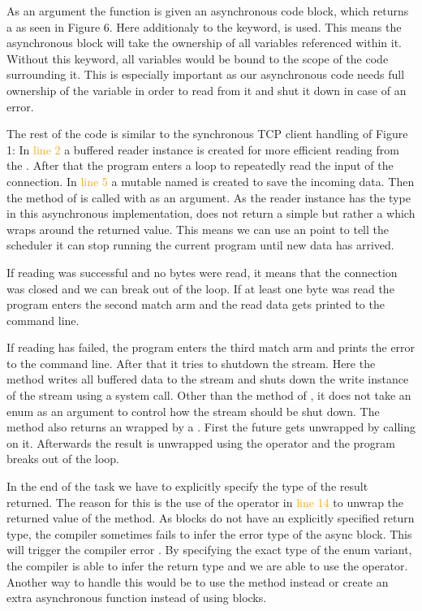 As an argument the function is given an asynchronous code block, which returns a  as seen in Figure 6.
Here additionaly to the  keyword,  is used. This means the asynchronous block will take the
ownership of all variables referenced within it. Without this keyword, all variables would be bound to the scope of the
code surrounding it. This is especially important as our asynchronous code needs full ownership of the 
variable in order to read from it and shut it down in case of an error.

The rest of the code is similar to the synchronous TCP client handling of Figure 1: In \textcolor{orange}{line 2} a
buffered reader instance is created for more efficient reading from the . After that the program enters
a loop to repeatedly read the input of the connection. In \textcolor{orange}{line 5} a mutable  named
 is created to save the incoming data. Then the method  of  is called with
 as an argument. As the reader instance has the type  in this asynchronous
implementation,  does not return a simple  but rather a  which wraps around
the returned value. This means we can use an  point to tell the scheduler it can stop running the current
program until new data has arrived.

If reading was successful and no bytes were read, it means that the connection was closed and we can break out of the
loop. If at least one byte was read the program enters the second match arm and the read data gets printed to the
command line.

If reading has failed, the program enters the third match arm and prints the error to the command line. After that it
tries to shutdown the stream. Here the  method writes all buffered data to the stream and shuts down the
write instance of the stream using a system call. Other than the  method of ,
it does not take an enum as an argument to control how the stream should be shut down. The method also returns an
 wrapped by a . First the future gets unwrapped by calling  on it. Afterwards the
result is unwrapped using the  operator and the program breaks out of the loop.

In the end of the task we have to explicitly specify the type of the result returned. The reason for this is the use of
the  operator in \textcolor{orange}{line 14} to unwrap the returned value of the  method. As
 blocks do not have an explicitly specified return type, the compiler sometimes fails to infer the error
type of the async block. This will trigger the compiler error . By specifying the
exact type of the  enum variant, the compiler is able to infer the return type and we are able to use the
 operator. Another way to handle this would be to use the  method instead or create an extra
asynchronous function instead of using  blocks. \cite{async-rust}

